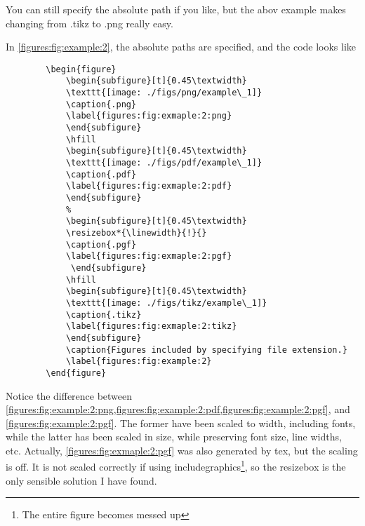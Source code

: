     You can still specify the absolute path if you like, but the abov example makes changing from .tikz to .png really easy. 
    
    In \cref{figures:fig:example:2}, the absolute paths are specified, and the code looks like

    \begin{verbatim}
        \begin{figure}
            \begin{subfigure}[t]{0.45\textwidth}
            \texttt{[image: ./figs/png/example\_1]}
            \caption{.png}
            \label{figures:fig:exmaple:2:png}
            \end{subfigure}
            \hfill
            \begin{subfigure}[t]{0.45\textwidth}
            \texttt{[image: ./figs/pdf/example\_1]}
            \caption{.pdf}
            \label{figures:fig:exmaple:2:pdf}
            \end{subfigure}
            %
            \begin{subfigure}[t]{0.45\textwidth}
            \resizebox*{\linewidth}{!}{}
            \caption{.pgf}
            \label{figures:fig:exmaple:2:pgf}
             \end{subfigure} 
            \hfill     
            \begin{subfigure}[t]{0.45\textwidth}
            \texttt{[image: ./figs/tikz/example\_1]}
            \caption{.tikz}
            \label{figures:fig:exmaple:2:tikz}
            \end{subfigure}     
            \caption{Figures included by specifying file extension.}   
            \label{figures:fig:example:2}
        \end{figure}
    \end{verbatim}

    Notice the difference between \cref{figures:fig:example:2:png,figures:fig:example:2:pdf,figures:fig:example:2:pgf}, and \cref{figures:fig:example:2:pgf}.
    The former have been scaled to width, including fonts, while the latter has been scaled in size, while preserving font size, line widths, etc.
    Actually, \cref{figures:fig:exmaple:2:pgf} was also generated by tex, but the scaling is off. It is not scaled correctly if using includegraphics\footnote{The entire figure becomes messed up},
    so the resizebox is the only sensible solution I have found. 

